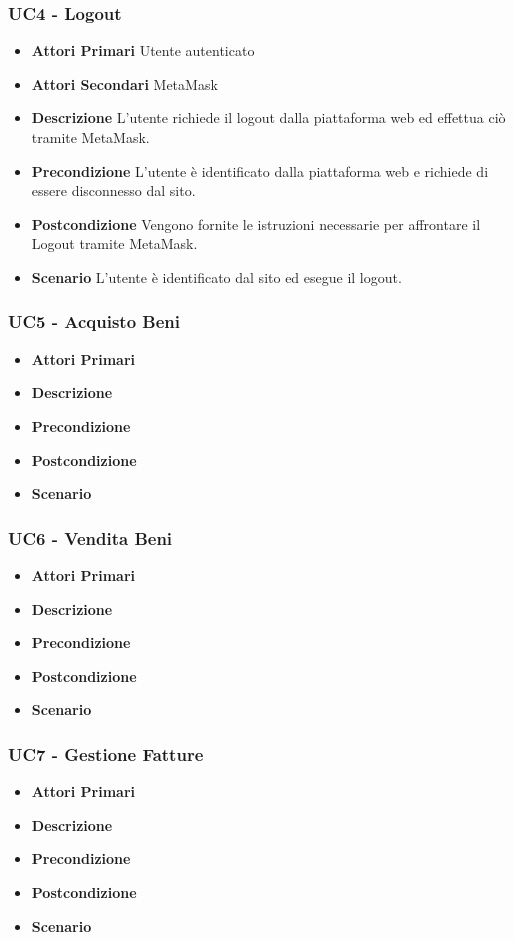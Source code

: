 \subsubsection{UC4 - Logout}
\begin{itemize}
	\item \textbf{Attori Primari}
	Utente autenticato
	\item \textbf{Attori Secondari}
	MetaMask\glo
	\item \textbf{Descrizione}
	L'utente richiede il logout dalla piattaforma web ed effettua ciò tramite MetaMask\glo.
	\item \textbf{Precondizione}
	L'utente è identificato dalla piattaforma web e richiede di essere disconnesso dal sito.
	\item \textbf{Postcondizione}
	Vengono fornite le istruzioni necessarie per affrontare il Logout tramite MetaMask\glo. 
	\item \textbf{Scenario}
	L'utente è identificato dal sito ed esegue il logout.
\end{itemize}
\subsubsection{UC5 - Acquisto Beni}
\begin{itemize}
	\item \textbf{Attori Primari}
	\item \textbf{Descrizione}
	\item \textbf{Precondizione}
	\item \textbf{Postcondizione}
	\item \textbf{Scenario}
\end{itemize}
\subsubsection{UC6 - Vendita Beni}
\begin{itemize}
	\item \textbf{Attori Primari}
	\item \textbf{Descrizione}
	\item \textbf{Precondizione}
	\item \textbf{Postcondizione}
	\item \textbf{Scenario}
\end{itemize}
\subsubsection{UC7 - Gestione Fatture}
\begin{itemize}
	\item \textbf{Attori Primari}
	\item \textbf{Descrizione}
	\item \textbf{Precondizione}
	\item \textbf{Postcondizione}
	\item \textbf{Scenario}
\end{itemize}
